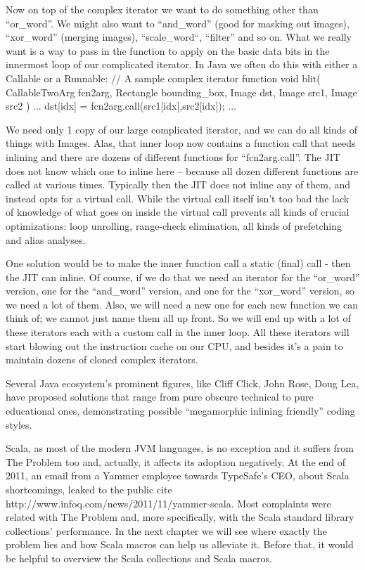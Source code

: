 Now on top of the complex iterator we want to do something other than
``or_word''.
  We might also want to “and_word” (good for masking out images), “xor_word”
(merging images), “scale_word“,  “filter” and so on.  What we really want is a
way to pass in the function to apply on the basic data bits in the innermost
loop of our complicated iterator.  In Java we often do this with either a
Callable or a Runnable:
  // A sample complex iterator function
  void blit( CallableTwoArg fcn2arg, Rectangle bounding_box, Image dst, Image
src1, Image src2 ) {
    ...
      dst[idx] = fcn2arg.call(src1[idx],src2[idx]);
    ...
  }
  
We need only 1 copy of our large complicated iterator, and we can do all kinds
of things with Images.  Alas, that inner loop now contains a function call that
needs inlining and there are dozens of different functions for “fcn2arg.call”. 
The JIT does not know which one to inline here – because all dozen different
functions are called at various times.  Typically then the JIT does not inline
any of them, and instead opts for a virtual call.  While the virtual call
itself isn’t too bad the lack of knowledge of what goes on inside the virtual
call prevents all kinds of crucial optimizations: loop unrolling, range-check
elimination, all kinds of prefetching and alias analyses.

One solution  would be to make the inner function call a static (final) call -
then the JIT can inline. Of course, if we do that we need an iterator for the
“or_word” version, one for the “and_word” version, and one for the “xor_word”
version, so we need a lot of them. Also, we will need a new one for each
new function we can think of; we cannot just name them all up front.  So we will
end up with a lot of these iterators each with a custom call in the inner loop.
All these iterators will start blowing out the instruction cache on our CPU, and
besides it's a pain to maintain dozens of cloned complex iterators.

Several Java ecosystem's prominent figures, like Cliff Click, John Rose, Doug
Lea, have proposed solutions that range from pure obscure technical to pure
educational ones, demonstrating possible ``megamorphic inlining friendly''
coding styles.

Scala, as most of the modern JVM languages, is no exception and it suffers from
The Problem too and, actually, it affects its adoption negatively. At the end of
2011, an email from a Yammer employee towards TypeSafe's CEO, about Scala
shortcomings, leaked to the public {cite
http://www.infoq.com/news/2011/11/yammer-scala}. Most complaints were related
with The Problem and, more specifically, with the Scala standard
library collections' performance. In the next chapter we will see where exactly
the problem lies and how Scala macros can help us alleviate it. Before that, it
would be helpful to overview the Scala collections and Scala macros.


